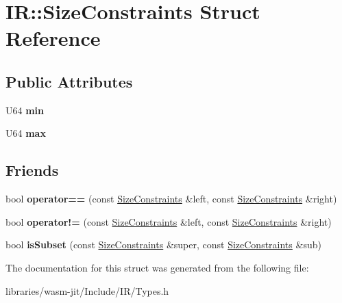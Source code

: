 \hypertarget{struct_i_r_1_1_size_constraints}{}\section{IR\+:\+:Size\+Constraints Struct Reference}
\label{struct_i_r_1_1_size_constraints}
\subsection*{Public Attributes}
\begin{DoxyCompactItemize}
\item 
\mbox{\label{struct_i_r_1_1_size_constraints_a1c14a08815ebd644f74f1cb4ba311616}} 
U64 {\bfseries min}
\item 
\mbox{\label{struct_i_r_1_1_size_constraints_adc8bdcc2a510a4ae1f54ba3c0938e8a4}} 
U64 {\bfseries max}
\end{DoxyCompactItemize}
\subsection*{Friends}
\begin{DoxyCompactItemize}
\item 
\mbox{\label{struct_i_r_1_1_size_constraints_a5ee86a1a80364f329894cb01174f47e3}} 
bool {\bfseries operator==} (const \mbox{\hyperlink{struct_i_r_1_1_size_constraints}{Size\+Constraints}} \&left, const \mbox{\hyperlink{struct_i_r_1_1_size_constraints}{Size\+Constraints}} \&right)
\item 
\mbox{\label{struct_i_r_1_1_size_constraints_a472e0c4784c3b8da1e1cea64f58366d0}} 
bool {\bfseries operator!=} (const \mbox{\hyperlink{struct_i_r_1_1_size_constraints}{Size\+Constraints}} \&left, const \mbox{\hyperlink{struct_i_r_1_1_size_constraints}{Size\+Constraints}} \&right)
\item 
\mbox{\label{struct_i_r_1_1_size_constraints_a3b276d5593855179204e83dd63b3426f}} 
bool {\bfseries is\+Subset} (const \mbox{\hyperlink{struct_i_r_1_1_size_constraints}{Size\+Constraints}} \&super, const \mbox{\hyperlink{struct_i_r_1_1_size_constraints}{Size\+Constraints}} \&sub)
\end{DoxyCompactItemize}


The documentation for this struct was generated from the following file\+:\begin{DoxyCompactItemize}
\item 
libraries/wasm-\/jit/\+Include/\+I\+R/Types.\+h\end{DoxyCompactItemize}
